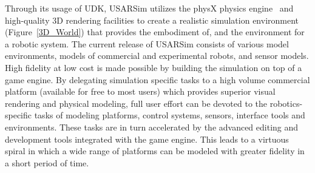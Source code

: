 Through its usage of UDK, USARSim utilizes the physX physics engine~\cite{physXWeb} and high-quality 3D rendering facilities to create a realistic simulation environment (Figure~\ref{3D_World}) that provides the embodiment of, and the environment for a robotic
system. The current release of USARSim consists of various model environments, models of commercial and experimental robots, and sensor models. High fidelity at low cost is made possible by building the simulation on top of a game engine. By delegating  simulation specific tasks to a high volume commercial platform (available for free to most users) which provides superior visual rendering and physical modeling, full user effort can be devoted to the robotics-specific tasks of modeling platforms, control systems, sensors, interface tools and environments. These tasks are in turn accelerated by the advanced editing and development tools integrated with the game engine. This leads to a virtuous spiral in which a wide range of platforms can be modeled with greater fidelity in a short period of time.


